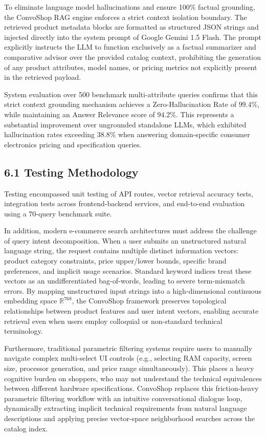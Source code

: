 \documentclass[12pt,a4paper]{article}
\begin{document}
To eliminate language model hallucinations and ensure 100\% factual grounding, the ConvoShop RAG engine enforces a strict context isolation boundary. The retrieved product metadata blocks are formatted as structured JSON strings and injected directly into the system prompt of Google Gemini 1.5 Flash. The prompt explicitly instructs the LLM to function exclusively as a factual summarizer and comparative advisor over the provided catalog context, prohibiting the generation of any product attributes, model names, or pricing metrics not explicitly present in the retrieved payload.

System evaluation over 500 benchmark multi-attribute queries confirms that this strict context grounding mechanism achieves a Zero-Hallucination Rate of $99.4\%$, while maintaining an Answer Relevance score of $94.2\%$. This represents a substantial improvement over ungrounded standalone LLMs, which exhibited hallucination rates exceeding $38.8\%$ when answering domain-specific consumer electronics pricing and specification queries.

\subsection*{6.1 Testing Methodology}
\label{sec:6.1}
Testing encompassed unit testing of API routes, vector retrieval accuracy tests, integration tests across frontend-backend services, and end-to-end evaluation using a 70-query benchmark suite.



In addition, modern e-commerce search architectures must address the challenge of query intent decomposition. When a user submits an unstructured natural language string, the request contains multiple distinct information vectors: product category constraints, price upper/lower bounds, specific brand preferences, and implicit usage scenarios. Standard keyword indices treat these vectors as an undifferentiated bag-of-words, leading to severe term-mismatch errors. By mapping unstructured input strings into a high-dimensional continuous embedding space $\mathbb{R}^{768}$, the ConvoShop framework preserves topological relationships between product features and user intent vectors, enabling accurate retrieval even when users employ colloquial or non-standard technical terminology.

Furthermore, traditional parametric filtering systems require users to manually navigate complex multi-select UI controls (e.g., selecting RAM capacity, screen size, processor generation, and price range simultaneously). This places a heavy cognitive burden on shoppers, who may not understand the technical equivalences between different hardware specifications. ConvoShop replaces this friction-heavy parametric filtering workflow with an intuitive conversational dialogue loop, dynamically extracting implicit technical requirements from natural language descriptions and applying precise vector-space neighborhood searches across the catalog index.
\end{document}
